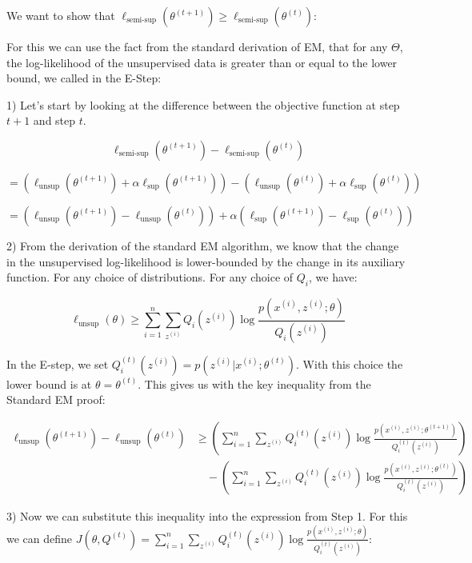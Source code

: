 \begin{answer}
    
    We want to show that $\ell_{\text{semi-sup}}(\theta^{(t+1)}) \geq \ell_{\text{semi-sup}}(\theta^{(t)})$:

    For this we can use the fact from the standard derivation of EM, that for any $\Theta$, the log-likelihood of the unsupervised data is greater than or equal to the lower bound, we called in the E-Step:

    1) Let's start by looking at the difference between the objective function at step $t+1$ and step $t$.

    $$\ell_{\text{semi-sup}}(\theta^{(t+1)}) - \ell_{\text{semi-sup}}(\theta^{(t)})$$

    $$= \left( \ell_{\text{unsup}}(\theta^{(t+1)}) + \alpha \ell_{\text{sup}}(\theta^{(t+1)}) \right) - \left( \ell_{\text{unsup}}(\theta^{(t)}) + \alpha \ell_{\text{sup}}(\theta^{(t)}) \right)$$

    $$= \left( \ell_{\text{unsup}}(\theta^{(t+1)}) - \ell_{\text{unsup}}(\theta^{(t)}) \right) + \alpha \left( \ell_{\text{sup}}(\theta^{(t+1)}) - \ell_{\text{sup}}(\theta^{(t)}) \right)$$

    2) From the derivation of the standard EM algorithm, we know that the change in the unsupervised log-likelihood is lower-bounded by the change in its auxiliary function. For any choice of distributions. For any choice of $Q_i$, we have:

    $$\ell_{\text{unsup}}(\theta) \ge \sum_{i=1}^{n} \sum_{z^{(i)}} Q_i(z^{(i)}) \log \frac{p(x^{(i)}, z^{(i)}; \theta)}{Q_i(z^{(i)})}$$

    In the E-step, we set $Q_i^{(t)}(z^{(i)}) = p(z^{(i)} | x^{(i)}; \theta^{(t)})$. With this choice the lower bound is at $\theta = \theta^{(t)}$. This gives us with the key inequality from the Standard EM proof:

    \begin{align}
    \ell_{\text{unsup}}(\theta^{(t+1)}) - \ell_{\text{unsup}}(\theta^{(t)}) &\geq \left( \sum_{i=1}^{n} \sum_{z^{(i)}} Q_i^{(t)}(z^{(i)}) \log \frac{p(x^{(i)}, z^{(i)}; \theta^{(t+1)})}{Q_i^{(t)}(z^{(i)})} \right) \\
    &\quad - \left( \sum_{i=1}^{n} \sum_{z^{(i)}} Q_i^{(t)}(z^{(i)}) \log \frac{p(x^{(i)}, z^{(i)}; \theta^{(t)})}{Q_i^{(t)}(z^{(i)})} \right)
    \end{align}

    3) Now we can substitute this inequality into the expression from Step 1. For this we can define $J(\theta, Q^{(t)}) = \sum_{i=1}^{n} \sum_{z^{(i)}} Q_i^{(t)}(z^{(i)}) \log \frac{p(x^{(i)}, z^{(i)}; \theta)}{Q_i^{(t)}(z^{(i)})}$: 


\end{answer}
